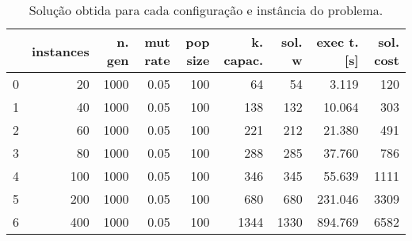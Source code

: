 \documentclass{article}
\begin{document}
\begin{table}
\centering
\begin{tabular}{lrrrrrrrr}
\toprule
{} &  instances &  n. gen &  mut rate &  pop size &  k. capac. &  sol. w &  exec t. [s] &  sol. cost \\
\midrule
0 &         20 &    1000 &      0.05 &       100 &         64 &      54 &        3.119 &        120 \\
1 &         40 &    1000 &      0.05 &       100 &        138 &     132 &       10.064 &        303 \\
2 &         60 &    1000 &      0.05 &       100 &        221 &     212 &       21.380 &        491 \\
3 &         80 &    1000 &      0.05 &       100 &        288 &     285 &       37.760 &        786 \\
4 &        100 &    1000 &      0.05 &       100 &        346 &     345 &       55.639 &       1111 \\
5 &        200 &    1000 &      0.05 &       100 &        680 &     680 &      231.046 &       3309 \\
6 &        400 &    1000 &      0.05 &       100 &       1344 &    1330 &      894.769 &       6582 \\
\bottomrule
\end{tabular}
\caption{Solução obtida para cada configuração e instância do problema.}
\label{table:all-data}
\end{table}
\end{document}
